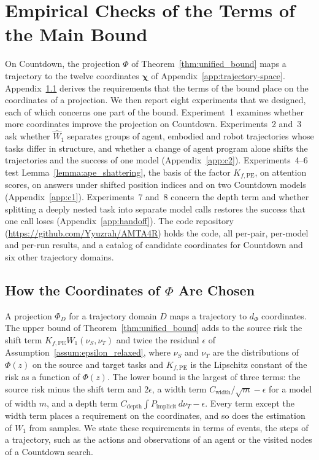 \section{Empirical Checks of the Terms of the Main Bound}
\label{app:beyond}
\providecommand{\ontoR}{\raggedright\hspace{0pt}}
\renewcommand{\topfraction}{0.9}\renewcommand{\textfraction}{0.08}\renewcommand{\floatpagefraction}{0.85}

On Countdown, the projection $\Phi$ of Theorem~\ref{thm:unified_bound} maps a trajectory to the twelve coordinates $\boldsymbol\chi$ of Appendix~\ref{app:trajectory-space}. Appendix~\ref{app:ontology} derives the requirements that the terms of the bound place on the coordinates of a projection. We then report eight experiments that we designed, each of which concerns one part of the bound. Experiment~1 examines whether more coordinates improve the projection on Countdown. Experiments~2 and~3 ask whether $\widehat W_1$ separates groups of agent, embodied and robot trajectories whose tasks differ in structure, and whether a change of agent program alone shifts the trajectories and the success of one model (Appendix~\ref{app:c2}). Experiments~4--6 test Lemma~\ref{lemma:ape_shattering}, the basis of the factor $K_{f,\mathrm{PE}}$, on attention scores, on answers under shifted position indices and on two Countdown models (Appendix~\ref{app:c1}). Experiments~7 and~8 concern the depth term and whether splitting a deeply nested task into separate model calls restores the success that one call loses (Appendix~\ref{app:handoff}). The code repository (\url{https://github.com/Yyuzrah/AMTA4R}) holds the code, all per-pair, per-model and per-run results, and a catalog of candidate coordinates for Countdown and six other trajectory domains.

\subsection{How the Coordinates of \texorpdfstring{$\Phi$}{Phi} Are Chosen}
\label{app:ontology}

A projection $\Phi_D$ for a trajectory domain $D$ maps a trajectory to $d_\Phi$ coordinates. The upper bound of Theorem~\ref{thm:unified_bound} adds to the source risk the shift term $K_{f,\mathrm{PE}}W_1(\nu_S,\nu_T)$ and twice the residual $\epsilon$ of Assumption~\ref{assum:epsilon_relaxed}, where $\nu_S$ and $\nu_T$ are the distributions of $\Phi(z)$ on the source and target tasks and $K_{f,\mathrm{PE}}$ is the Lipschitz constant of the risk as a function of $\Phi(z)$. The lower bound is the largest of three terms: the source risk minus the shift term and $2\epsilon$, a width term $C_{\mathrm{width}}/\sqrt m-\epsilon$ for a model of width $m$, and a depth term $C_{\mathrm{depth}}\int P_{\mathrm{implicit}}\,d\nu_T-\epsilon$. Every term except the width term places a requirement on the coordinates, and so does the estimation of $W_1$ from samples. We state these requirements in terms of events, the steps of a trajectory, such as the actions and observations of an agent or the visited nodes of a Countdown search.

